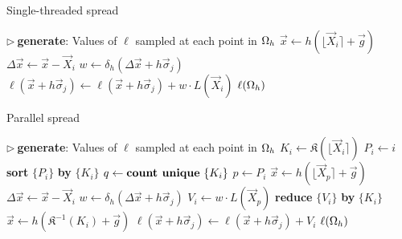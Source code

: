 \begin{algorithm}
\caption{Single-threaded spread}
\label{algo:serial-spread}
\begin{algorithmic}[1]
\State $\triangleright\ $\textbf{generate}: Values of $\ell$ sampled at each point in $\Omega_h$
    \State $\vec{x} \gets h(\lfloor\vec{X}_i\rceil+\vec{g})$
    \State $\Delta\vec{x} \gets \vec{x}-\vec{X}_i$
        \State $w \gets \delta_h(\Delta\vec{x}+h\vec{\sigma}_j)$
        \State $\ell(\vec{x}+h\vec{\sigma}_j) \gets \ell(\vec{x}+h\vec{\sigma}_j) + w \cdot L(\vec{X}_i)$
    \EndFor
\EndFor
\State \Return $\ell(\Omega_h)$
\EndProcedure
\end{algorithmic}
\end{algorithm}

\begin{algorithm}
\caption{Parallel spread}
\label{algo:par-spread}
\begin{algorithmic}[1]
\State $\triangleright\ $\textbf{generate}: Values of $\ell$ sampled at each point in $\Omega_h$
    \State $K_i \gets \mathfrak{K}(\lfloor\vec{X}_i\rceil)$ 
    \State $P_i \gets i$ 
\EndFor
\State \textbf{sort} $\{P_i\}$ \textbf{by} $\{K_i\}$
\State $q \gets \text{\textbf{count unique} }\{K_i\}$
        \State $p \gets P_i$
        \State $\vec{x} \gets h(\lfloor\vec{X}_p\rceil+\vec{g})$
        \State $\Delta\vec{x} \gets \vec{x}-\vec{X}_i$
        \State $w \gets \delta_h(\Delta\vec{x}+h\vec{\sigma}_j)$
        \State $V_i \gets w \cdot L(\vec{X}_p)$
    \EndFor
    \State \textbf{reduce} $\{V_i\}$ \textbf{by} $\{K_i\}$
        \State $\vec{x} \gets h(\mathfrak{K}^{-1}(K_i) + \vec{g})$
        \State $\ell(\vec{x} + h\vec{\sigma}_j) \gets \ell(\vec{x} + h\vec{\sigma}_j) + V_i$
    \EndFor
\EndFor
\State \Return $\ell(\Omega_h)$
\EndProcedure
\end{algorithmic}
\end{algorithm}

